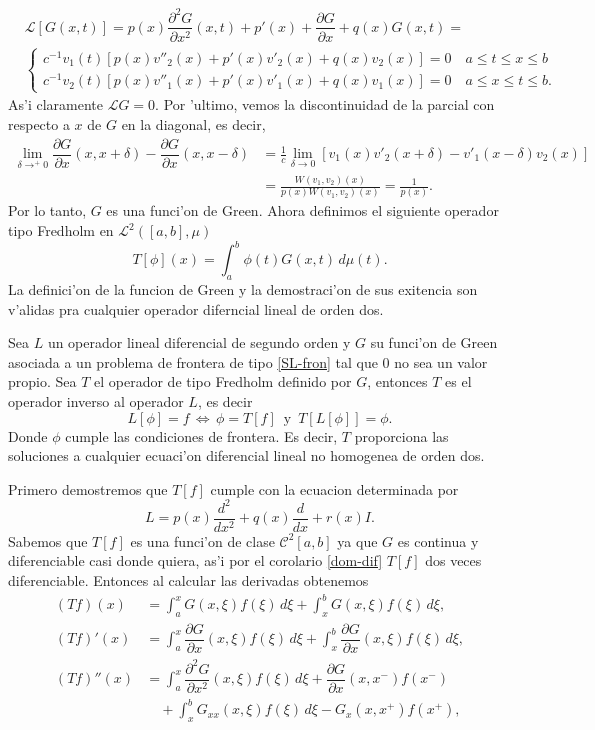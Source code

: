 \documentclass[main.tex]{subfiles}
\begin{document}
  \begin{align*}
    &\mathcal{L}[G(x,t)]=p(x)\dfrac{\partial^{2} G}{\partial x^{2}}(x,t)+p'(x) + \dfrac{\partial G}{\partial x}+q(x)G(x,t)=\\
    &\begin{cases}
    c^{-1}v_{1}(t)[p(x)v''_{2}(x)+p'(x)v'_{2}(x)+q(x)v_{2}(x)]=0\quad a\leq t\leq x\leq b\\
    c^{-1}v_{2}(t)[p(x)v''_{1}(x)+p'(x)v'_{1}(x)+q(x)v_{1}(x)]=0\quad a\leq x\leq t\leq b.
  \end{cases}
  \end{align*}
  As'i claramente $\mathcal{L}G=0$. Por 'ultimo, vemos la discontinuidad de la parcial con respecto a $x$ de $G$ en la diagonal, es decir,
  \begin{align*} 
    \lim_{\delta\to^{+}0}\dfrac{\partial G}{\partial x}(x,x+\delta)-\dfrac{\partial G}{\partial x}(x,x-\delta)
    &=\frac{1}{c}\lim_{\delta\to0}[v_{1}(x)v'_{2}(x+\delta)-v'_{1}(x-\delta)v_{2}(x)]\\
    &=\frac{W(v_{1},v_{2})(x)}{p(x)W(v_{1},v_{2})(x)}=\frac{1}{p(x)}.
  \end{align*}
  Por lo tanto, $G$ es una funci'on de Green. Ahora definimos el siguiente operador tipo Fredholm en $\mathcal{L}^{2}([a,b],\mu)$
  \[
    T[\phi](x)=\int_{a}^{b}\phi(t)G(x,t)\,d\mu(t).
  \]
  \obs La definici'on de la funcion de Green y la demostraci'on de sus exitencia son v'alidas pra cualquier operador diferncial lineal de orden dos.
  \begin{teorema}
    Sea $L$ un operador lineal diferencial de segundo orden y $G$ su funci'on de Green asociada a un problema de frontera de tipo \ref{SL-fron} tal que $0$ no sea un valor propio. Sea $T$ el operador de tipo Fredholm definido por $G$, entonces $T$ es el operador inverso al operador $L$, es decir
    \[
      L[\phi]=f\,\iff\,\phi=T[f]\,\text{ y }\,T[L[\phi]]=\phi.
    \]
    Donde $\phi$ cumple las condiciones de frontera. Es decir, $T$ proporciona las soluciones a cualquier ecuaci'on diferencial lineal no homogenea de orden dos.
  \end{teorema}
  \dem Primero demostremos que $T[f]$ cumple con la ecuacion determinada por
  \[
    L=p(x)\dfrac{d^{2}}{dx^{2}}+q(x)\dfrac{d}{dx}+r(x)I.
  \]
  Sabemos que $T[f]$ es una funci'on de clase $\mathcal{C}^{2}[a,b]$ ya que $G$ es continua y diferenciable casi donde quiera, as'i por el corolario \ref{dom-dif} $T[f]$ dos veces diferenciable. Entonces al calcular las derivadas obtenemos
 \begin{align*}
   (T f)(x)&= \int_{a}^{x} G(x, \xi)f(\xi)\,d\xi + \int_{x}^{b} G(x, \xi)f(\xi)\,d\xi, \\
   (T f)'(x)&=\int_{a}^{x}\dfrac{\partial G}{\partial x}(x, \xi)f(\xi)\,d\xi +
              \int_{x}^{b} \dfrac{\partial G}{\partial x}(x, \xi)f(\xi)\,d\xi, \\
   (T f)''(x)&=\int_{a}^{x} \dfrac{\partial^{2} G}{\partial x^{2}}(x, \xi)f(\xi)\,d\xi +
              \dfrac{\partial G}{\partial x}(x, x^{-})f(x^{-}) \\
           &\quad + \int_{x}^{b} G_{xx}(x, \xi)f(\xi)\,d\xi - G_x(x, x^{+})f(x^{+}),
\end{align*}
\end{document}
